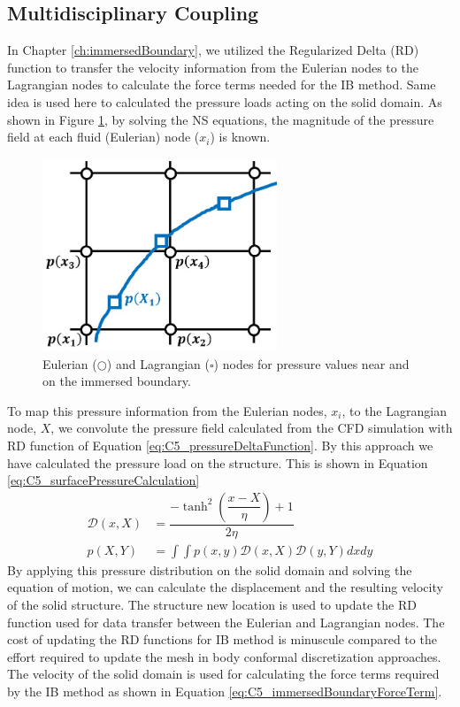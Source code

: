 \subsection{Multidisciplinary Coupling}
In Chapter \ref{ch:immersedBoundary}, we utilized the Regularized Delta (RD) function to transfer the velocity information from the Eulerian nodes to the Lagrangian nodes to calculate the force terms needed for the IB method. Same idea is used here to calculated the pressure loads acting on the solid domain. As shown in Figure \ref{fig:C5_pressureMapping}, by solving the NS equations, the magnitude of the pressure field at each fluid (Eulerian) node ($x_i$) is known.
%
\begin{figure}[H]
    \centering
    \includegraphics[width=7.00cm]{Chapter_5/figure/Chapter5_pressureMapping.jpg}
    \caption{Eulerian ($\bigcirc$) and Lagrangian ($\square$) nodes for pressure values near and on the immersed boundary.}
    \label{fig:C5_pressureMapping}
\end{figure}
%
To map this pressure information from the Eulerian nodes, $x_i$, to the Lagrangian node, $X$, we convolute the pressure field calculated from the CFD simulation with RD function of Equation \eqref{eq:C5_pressureDeltaFunction}.  By this approach we have calculated the pressure load on the structure. This is shown in Equation \eqref{eq:C5_surfacePressureCalculation}
%
\begin{subequations}
\begin{align}
    \mathcal{D}(x, X) &=
    \dfrac{-\tanh^{2}{\left (\dfrac{x - X}{\eta} \right )} + 1}{2 \eta}
    \label{eq:C5_pressureDeltaFunction}
    \\
    p(X, Y) &= \int \int p(x,y) \mathcal{D}(x, X) \mathcal{D}(y, Y) dx dy
    \label{eq:C5_surfacePressureCalculation}
\end{align}
\end{subequations}
%
By applying this pressure distribution on the solid domain and solving the equation of motion, we can calculate the displacement and the resulting velocity of the solid structure. The structure new location is used to update the RD function used for data transfer between the Eulerian and Lagrangian nodes. The cost of updating the RD functions for IB method is minuscule compared to the effort required to update the mesh in body conformal discretization approaches. The velocity of the solid domain is used for calculating the force terms required by the IB method as shown in Equation \eqref{eq:C5_immersedBoundaryForceTerm}.
